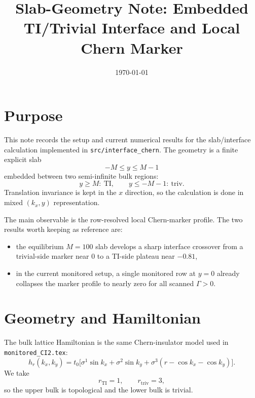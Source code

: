 \documentclass[11pt]{article}
\newcommand{\TI}{\mathrm{TI}}
\newcommand{\triv}{\mathrm{triv}}
\begin{document}
\title{Slab-Geometry Note: Embedded TI/Trivial Interface and Local Chern Marker}
\author{}
\date{\today}

\maketitle

\section{Purpose}

This note records the setup and current numerical results for the slab/interface
calculation implemented in \texttt{src/interface\_chern}.  The geometry is a
finite explicit slab
\begin{equation}
  -M \le y \le M-1
\end{equation}
embedded between two semi-infinite bulk regions:
\begin{equation}
  y \ge M:\ \TI,\qquad y \le -M-1:\ \triv.
\end{equation}
Translation invariance is kept in the \(x\) direction, so the calculation is
done in mixed \((k_x,y)\) representation.

The main observable is the row-resolved local Chern-marker profile.  The two
results worth keeping as reference are:
\begin{itemize}
\item the equilibrium \(M=100\) slab develops a sharp interface crossover from a
  trivial-side marker near \(0\) to a TI-side plateau near \(-0.81\),
\item in the current monitored setup, a single monitored row at \(y=0\) already
  collapses the marker profile to nearly zero for all scanned \(\Gamma>0\).
\end{itemize}

\section{Geometry and Hamiltonian}

The bulk lattice Hamiltonian is the same Chern-insulator model used in
\texttt{monitored\_CI2.tex}:
\begin{equation}
  h_r(k_x,k_y)
  =
  t_0\Big[
    \sigma^1 \sin k_x
    + \sigma^2 \sin k_y
    + \sigma^3(r-\cos k_x-\cos k_y)
  \Big].
\end{equation}
We take
\begin{equation}
  r_{\TI}=1,\qquad r_{\triv}=3,
\end{equation}
so the upper bulk is topological and the lower bulk is trivial.
\end{document}
